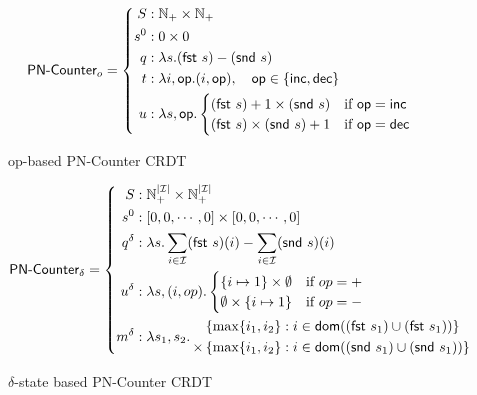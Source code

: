 \begin{figure}[H]
  \centering
  \[
    \textsf{PN-Counter}_o = \left\{\begin{aligned}
      S &: \mathbb{N}_+ \times \mathbb{N}_+  \\
      s^0 &: 0 \times 0 \\
      q &: \lambda s. (\textsf{fst}~s) - (\textsf{snd}~s) \\
      t &: \lambda i, \mathsf{op}. (i, \mathsf{op}),\quad \mathsf{op} \in \{
        \mathsf{inc}, \mathsf{dec} \} \\
      u &: \lambda s,\mathsf{op}. \begin{cases}
             (\textsf{fst}~s) + 1 \times (\textsf{snd}~s) & \text{if $\mathsf{op} = \mathsf{inc}$} \\
             (\textsf{fst}~s) \times (\textsf{snd}~s) + 1 & \text{if $\mathsf{op} = \mathsf{dec}$} \\
           \end{cases} \\
    \end{aligned}\right.
  \]
  \caption{op-based \textsf{PN-Counter} CRDT}
\end{figure}

\begin{figure}[H]
  \[
    \textsf{PN-Counter}_\delta = \left\{\begin{aligned}
      S &: \mathbb{N}_+^{|\mathcal{I}|} \times \mathbb{N}_+^{|\mathcal{I}|} \\
      s^0 &: \left[ 0, 0, \cdots, 0 \right] \times \left[ 0, 0, \cdots, 0 \right] \\
      q^\delta &: \lambda s. \sum_{i \in \mathcal{I}} (\textsf{fst}~s)(i) - \sum_{i \in
        \mathcal{I}} (\textsf{snd}~s)(i) \\
      u^\delta &: \lambda s,(i,op). \begin{cases}
             \{ i \mapsto 1 \} \times \emptyset & \text{if $op=+$} \\
             \emptyset \times \{ i \mapsto 1 \} & \text{if $op=-$} \\
           \end{cases} \\
      m^\delta &: \lambda s_1, s_2.\, \begin{aligned}
             &\left\{ \max\{ i_1, i_2 \} : i \in \mathsf{dom}((\textsf{fst}~s_1) \cup (\textsf{fst}~s_1)) \right\} \\
             \times &\left\{ \max\{ i_1, i_2 \} : i \in \mathsf{dom}((\textsf{snd}~s_1) \cup (\textsf{snd}~s_1)) \right\}
           \end{aligned}
    \end{aligned}\right.
  \]
  \caption{$\delta$-state based \textsf{PN-Counter} CRDT}
\end{figure}


